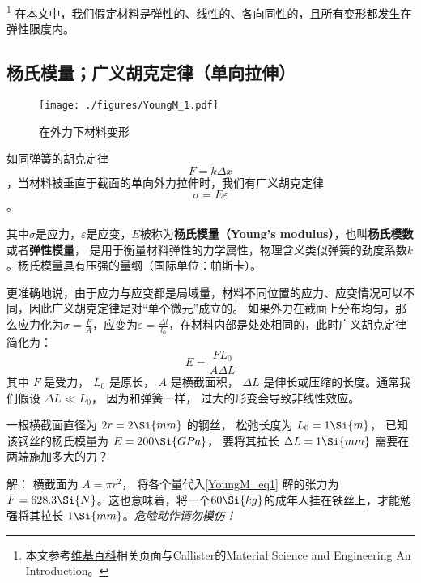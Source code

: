 
\begin{issues}
\issueDraft
\end{issues}

\footnote{本文参考\href{https://en.wikipedia.org/wiki/Young's_modulus}{维基百科}相关页面与Callister的Material Science and Engineering An Introduction。}
在本文中，我们假定材料是弹性的、线性的、各向同性的，且所有变形都发生在弹性限度内。

\subsection{杨氏模量；广义胡克定律（单向拉伸）}
\begin{figure}[ht]
\centering
\texttt{[image: ./figures/YoungM\_1.pdf]}
\caption{在外力下材料变形} \label{YoungM_fig1}
\end{figure}

如同弹簧的胡克定律$$F=k \Delta x$$，当材料被垂直于截面的单向外力拉伸时，我们有广义胡克定律
\begin{equation}
\sigma = E \varepsilon
\end{equation}。

其中$\sigma$是应力，$\varepsilon$是应变，$E$被称为\textbf{杨氏模量（Young's modulus）}，也叫\textbf{杨氏模数}或者\textbf{弹性模量}， 是用于衡量材料弹性的力学属性，物理含义类似弹簧的劲度系数$k$。杨氏模量具有压强的量纲（国际单位：帕斯卡）。

更准确地说，由于应力与应变都是局域量，材料不同位置的应力、应变情况可以不同，因此广义胡克定律是对“单个微元”成立的。
如果外力在截面上分布均匀，那么应力化为$\sigma=\frac{F}{A}$，应变为$\varepsilon=\frac{\Delta l}{l_0}$，在材料内部是处处相同的，此时广义胡克定律简化为：%
\begin{equation}\label{YoungM_eq1}
E = \frac{FL_0}{A\Delta L}
\end{equation}
其中 $F$ 是受力， $L_0$ 是原长， $A$ 是横截面积， $\Delta L$ 是伸长或压缩的长度。通常我们假设 $\Delta L \ll L_0$， 因为和弹簧一样， 过大的形变会导致非线性效应。

\begin{example}{}
一根横截面直径为 $2r = 2\Si{mm}$ 的钢丝， 松弛长度为 $L_0 = 1\Si{m}$， 已知该钢丝的杨氏模量为 $E = 200\Si{GPa}$， 要将其拉长 $\Delta L = 1\Si{mm}$ 需要在两端施加多大的力？

解： 横截面为 $A = \pi r^2$， 将各个量代入\autoref{YoungM_eq1} 解的张力为 $F = 628.3\Si{N}$。这也意味着，将一个$60 \Si{kg}$的成年人挂在铁丝上，才能勉强将其拉长 $1\Si{mm}$。\textsl{危险动作请勿模仿！}
\end{example}

